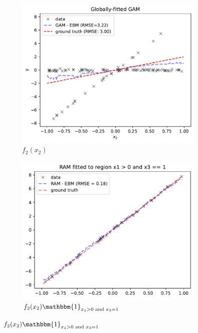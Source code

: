 \documentclass[12pt]{article}
\newcommand{\when}[1]{\mathbbm{1}_{#1}}
\begin{document}
\begin{figure}[htbp]
    \centering
    \begin{subfigure}{0.32\textwidth}
        \centering
        \includegraphics[width=\textwidth]{figures/global_GAM}
        \caption{\(f_2(x_2)\)}
        \label{subfig:global_gam}
    \end{subfigure}
    \begin{subfigure}{0.32\textwidth}
        \centering
        \includegraphics[width=\textwidth]{figures/regional_gam_subreg_1}
        \caption{\(f_2(x_2) \when{x_1 > 0 \text{ and } x_3 = 1}\)}
        \label{subfig:regional_gam_1}

\end{subfigure}
\end{figure}
\end{document}
